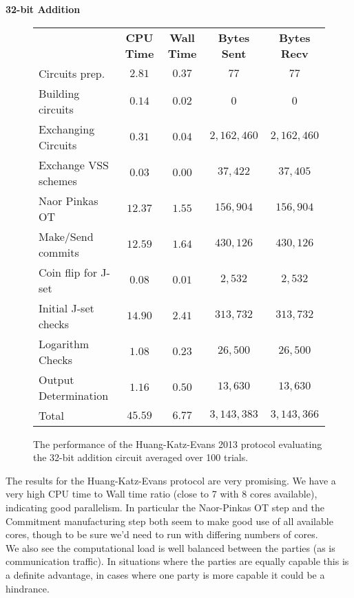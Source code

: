 \documentclass[ %
                    author={Nicholas Tutte},
                supervisor={Prof. Nigel Smart},
                    degree={MEng},
                     title={Secure Two Party Computation},
                  subtitle={A practical comparison of recent protocols},
                      type={Research - GG1K},
                      year={2015} ]{dissertation}
\begin{document}
				\FloatBarrier
				\noindent \textbf{32-bit Addition}
				\begin{figure}[!ht]
					\begin{tabular}{| p{4.3cm} | c c c c |}
						\hline
						 & \textbf{CPU Time} & \textbf{Wall Time} & \textbf{Bytes Sent} & \textbf{Bytes Recv} \\
						\thickhline
						Circuits prep. & $2.81$ & $0.37$ & $77$ & $77$ \\
						\hline
						Building circuits & $0.14$ & $0.02$ & $0$ & $0$ \\
						\hline
						Exchanging Circuits & $0.31$ & $0.04$ & $2,162,460$ & $2,162,460$ \\
						\hline
						Exchange VSS schemes & $0.03$ & $0.00$ & $37,422$ & $37,405$ \\
						\hline
						Naor Pinkas OT & $12.37$ & $1.55$ & $156,904$ & $156,904$ \\
						\hline
						Make/Send commits & $12.59$ & $1.64$ & $430,126$ & $430,126$ \\
						\hline
						Coin flip for J-set & $0.08$ & $0.01$ & $2,532$ & $2,532$ \\
						\hline
						Initial J-set checks & $14.90$ & $2.41$ & $313,732$ & $313,732$ \\
						\hline
						Logarithm Checks & $1.08$ & $0.23$ & $26,500$ & $26,500$ \\
						\hline
						Output Determination & $1.16$ & $0.50$ & $13,630$ & $13,630$ \\
						\thickhline
						Total & $45.59$ & $6.77$ & $3,143,383$ & $3,143,366$ \\
						\hline
					\end{tabular}
					\caption{The performance of the Huang-Katz-Evans 2013 protocol evaluating the 32-bit addition circuit averaged over 100 trials.\label{table:HKE_2013_Add}}
				\end{figure}

				The results for the Huang-Katz-Evans protocol are very promising. We have a very high CPU time to Wall time ratio (close to 7 with 8 cores available), indicating good parallelism. In particular the Naor-Pinkas OT step and the Commitment manufacturing step both seem to make good use of all available cores, though to be sure we'd need to run with differing numbers of cores.\\ 

				We also see the computational load is well balanced between the parties (as is communication traffic). In situations where the parties are equally capable this is a definite advantage, in cases where one party is more capable it could be a hindrance.\\
\end{document}
